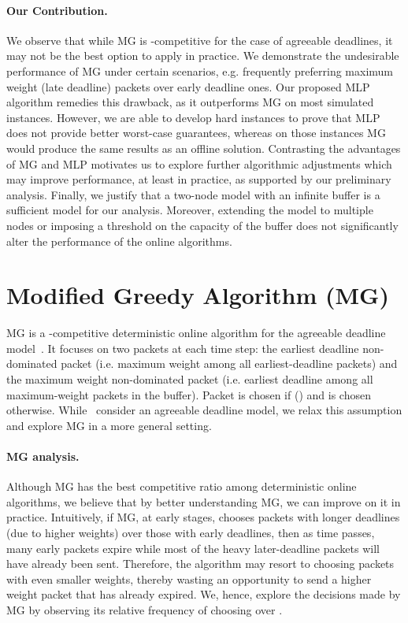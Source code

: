 \documentclass[oribibl]{llncs}
\begin{document}
\paragraph{Our Contribution.} We observe that while MG is -competitive for the case of agreeable deadlines, it may not be the best option
to apply in practice. We demonstrate  the undesirable
performance of MG under certain scenarios, e.g. frequently preferring
maximum weight (late deadline) packets over early deadline ones. Our
proposed MLP algorithm remedies this drawback, as it outperforms MG on
most simulated instances. However, we are able to develop hard
instances to prove that MLP does not provide better worst-case
guarantees, whereas on those instances MG would produce the same
results as an offline solution. Contrasting the advantages of MG and
MLP motivates us to explore further algorithmic adjustments which may
improve performance, at least in practice, as supported by our
preliminary analysis. Finally, we justify that a two-node model with
an infinite buffer is a sufficient model for our
analysis. Moreover, extending the model to multiple nodes or imposing a
threshold on the capacity of the buffer does not significantly alter the performance
of the online algorithms.  

\section{Modified Greedy Algorithm (MG)}
\label{sec:MG}


MG is a -competitive deterministic online algorithm for the
agreeable deadline model~\cite{jez12}. It focuses on two packets at
each time step: the earliest deadline non-dominated packet 
(i.e. maximum weight among all earliest-deadline packets) and the
maximum weight non-dominated packet  (i.e. earliest deadline among
all maximum-weight packets in the buffer). Packet  is chosen if
 () and  is chosen
otherwise. While~\cite{jez12} consider an agreeable deadline model,
we relax this assumption and explore MG in a more general setting.

\paragraph{ MG analysis.} Although MG has the best competitive ratio
among deterministic online algorithms, we believe
that by better understanding MG, we can improve on it in
practice. Intuitively, if MG, at early stages, chooses packets with
longer deadlines (due to higher weights) over those with early
deadlines, then as time passes, many early packets expire while
most of the heavy later-deadline  packets will have already been
sent. Therefore, the algorithm may resort to choosing packets
with even smaller weights, thereby
wasting an opportunity to send a higher weight packet that has
already expired.  We, hence, explore the decisions made by MG by observing
its relative frequency of choosing  over .  
\end{document}

